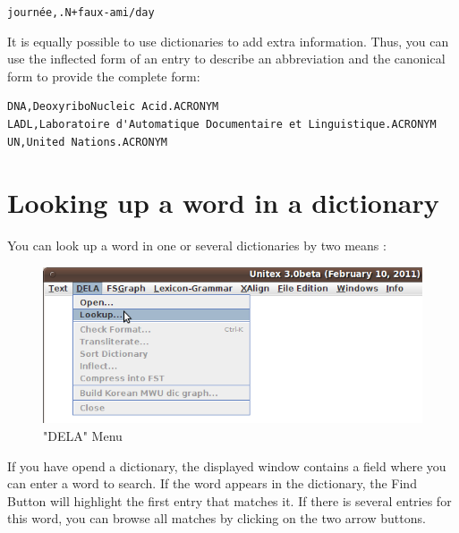 \noindent
\texttt{journ\'ee,.N+faux-ami/day}


\bigskip
\noindent It is equally possible to use dictionaries to add extra information.
Thus, you can use the inflected form of an entry to describe an abbreviation and the
canonical form to provide the complete form:

\bigskip
\begin{verbatim}
DNA,DeoxyriboNucleic Acid.ACRONYM
LADL,Laboratoire d'Automatique Documentaire et Linguistique.ACRONYM
UN,United Nations.ACRONYM
\end{verbatim}


\section{Looking up a word in a dictionary}
\label{section-dictionary-lookup}
You can look up a word in one or several dictionaries by two means : 

\begin{figure}[h!]
\begin{center}
\includegraphics[width=13cm]{resources/img/fig3-1.png}
\caption{"DELA" Menu}
\end{center}
\end{figure}

\bigskip
\noindent
If you have opend a dictionary, the displayed window contains a field where you can enter a word to search. If the word appears in the dictionary, the Find Button will highlight the first entry that matches it. If there is several entries for this word, you can browse all matches by clicking on the two arrow buttons.

